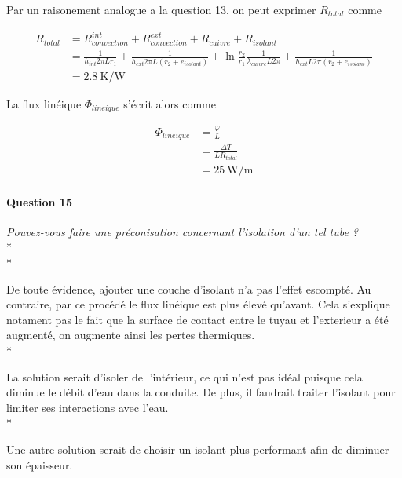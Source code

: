 \documentclass[oneside,a4paper,13pt]{book}
\begin{document}
Par un raisonement analogue a la question 13, on peut exprimer $R_{total}$ comme

\begin{equation} \label{eq12}
\begin{split}
	R_{total} & = R_{convection}^{int} + R_{convection}^{ext} + R_{cuivre} + R_{isolant} \\
	& = \frac{1}{h_{int}2 \pi L r_{1}} + \frac{1}{h_{ext}2 \pi L (r_{2} + e_{isolant})} +  \ln{\frac{r_{2}}{r_{1}}}\frac{1}{\lambda_{cuivre}L2\pi} + \frac{1}{h_{ext}L2\pi (r_{2} + e_{isolant})} \\
	& = \SI{2.8}{\kelvin\per\watt}
\end{split}
\end{equation}

La flux linéique $\Phi_{lineique}$ s'écrit alors comme

\begin{equation} \label{eq17}
\begin{split}
	\Phi_{lineique} & = \frac{\varphi}{L} \\
	& = \frac{\Delta T}{L R_{total}} \\
	& = \SI{25}{\watt\per\meter}
\end{split}
\end{equation}

\paragraph{Question 15} 
\textit{Pouvez-vous faire une préconisation concernant l’isolation d’un tel tube ?} \\* \\*

De toute évidence, ajouter une couche d'isolant n'a pas l'effet escompté. Au contraire, par ce procédé le flux linéique est plus élevé qu'avant. Cela s'explique notament pas le fait que la surface de contact entre le tuyau et l'exterieur a été augmenté, on augmente ainsi les pertes thermiques. \\*

La solution serait d'isoler de l'intérieur, ce qui n'est pas idéal puisque cela diminue le débit d'eau dans la conduite. De plus, il faudrait traiter l'isolant pour limiter ses interactions avec l'eau.  \\*

Une autre solution serait de choisir un isolant plus performant afin de diminuer son épaisseur.
\end{document}
